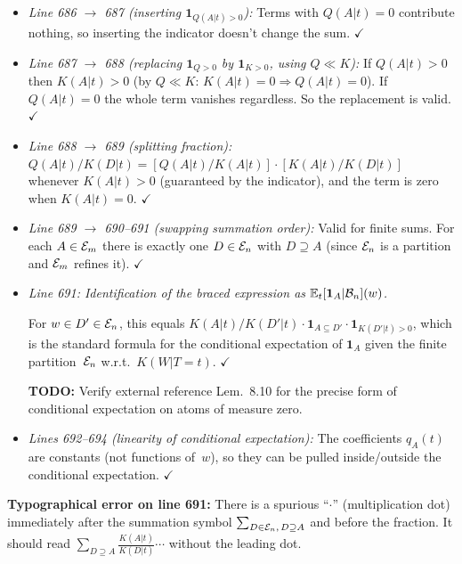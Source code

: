 \documentclass{article}
\begin{document}
\begin{enumerate}[leftmargin=*]
\begin{itemize}
      \item \emph{Line 686 $\to$ 687 (inserting $\mathbf{1}_{Q(A|t)>0}$):}
        Terms with $Q(A|t)=0$ contribute nothing, so inserting the indicator
        doesn't change the sum.  $\checkmark$

      \item \emph{Line 687 $\to$ 688 (replacing $\mathbf{1}_{Q>0}$ by
        $\mathbf{1}_{K>0}$, using $Q\ll K$):}
        If $Q(A|t)>0$ then $K(A|t)>0$ (by $Q\ll K$: $K(A|t)=0\Rightarrow Q(A|t)=0$).
        If $Q(A|t)=0$ the whole term vanishes regardless.
        So the replacement is valid.  $\checkmark$

      \item \emph{Line 688 $\to$ 689 (splitting fraction):}
        $Q(A|t)/K(D|t) = [Q(A|t)/K(A|t)]\cdot[K(A|t)/K(D|t)]$
        whenever $K(A|t)>0$ (guaranteed by the indicator), and the term is zero
        when $K(A|t)=0$.  $\checkmark$

      \item \emph{Line 689 $\to$ 690--691 (swapping summation order):}
        Valid for finite sums.  For each $A\in\mathcal{E}_m$ there is exactly one
        $D\in\mathcal{E}_n$ with $D\supseteq A$ (since $\mathcal{E}_n$ is a partition
        and $\mathcal{E}_m$ refines it).  $\checkmark$

      \item \emph{Line 691: Identification of the braced expression as
        $\mathbb{E}_t[\mathbf{1}_A|\mathcal{B}_n](w)$.}

        For $w\in D'\in\mathcal{E}_n$, this equals
        $K(A|t)/K(D'|t)\cdot\mathbf{1}_{A\subseteq D'}\cdot\mathbf{1}_{K(D'|t)>0}$,
        which is the standard formula for the conditional expectation of
        $\mathbf{1}_A$ given the finite partition~$\mathcal{E}_n$ w.r.t.\ $K(W|T=t)$.
        $\checkmark$

        \textbf{TODO:} Verify external reference \cite{Kle20} Lem.\ 8.10
        for the precise form of conditional expectation on atoms of measure zero.

      \item \emph{Lines 692--694 (linearity of conditional expectation):}
        The coefficients $q_A(t)$ are constants (not functions of~$w$), so they
        can be pulled inside/outside the conditional expectation.  $\checkmark$
    \end{itemize}

    \textbf{Typographical error on line 691:} There is a spurious
    ``$\cdot$'' (multiplication dot) immediately after the summation symbol
    $\sum_{D\in\mathcal{E}_n,\,D\supseteq A}$ and before the fraction.  It
    should read
    $\sum_{D\supseteq A} \frac{K(A|t)}{K(D|t)}\cdots$
    without the leading dot.


\end{enumerate}
\end{document}
